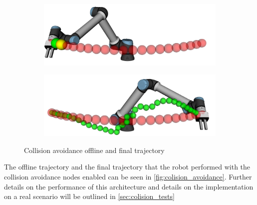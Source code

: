 \begin{figure}[h]
    \centering
    \begin{subfigure}{.50\linewidth}
      \centering
      \includegraphics[width=\linewidth]{figs/chp4/col_avoid_start.png}
    \end{subfigure}%
    \begin{subfigure}{.50\linewidth}
        \centering
        \includegraphics[width=\linewidth]{figs/chp4/col_avoid_end.png}
    \end{subfigure}
    \caption{Collision avoidance offline and final trajectory}
    \label{fig:colision_avoidance}
\end{figure}

\par The offline trajectory and the final trajectory that the robot performed with the collision avoidance nodes enabled can be seen in \autoref{fig:colision_avoidance}. Further details on the performance of this architecture and details on the implementation on a real scenario will be outlined in \autoref{sec:colision_tests}

